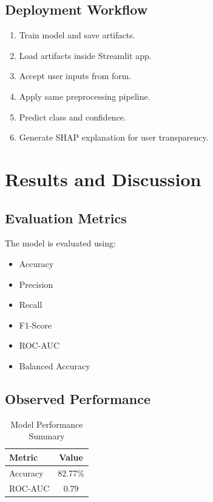 \documentclass[12pt,a4paper]{report}
\begin{document}
\section{Deployment Workflow}
\begin{enumerate}[leftmargin=1.2cm]
    \item Train model and save artifacts.
    \item Load artifacts inside Streamlit app.
    \item Accept user inputs from form.
    \item Apply same preprocessing pipeline.
    \item Predict class and confidence.
    \item Generate SHAP explanation for user transparency.
\end{enumerate}

\chapter{Results and Discussion}

\section{Evaluation Metrics}
The model is evaluated using:
\begin{itemize}[leftmargin=1.2cm]
    \item Accuracy
    \item Precision
    \item Recall
    \item F1-Score
    \item ROC-AUC
    \item Balanced Accuracy
\end{itemize}

\section{Observed Performance}
\begin{table}[H]
\centering
\caption{Model Performance Summary}
\begin{tabular}{lc}
\toprule
\textbf{Metric} & \textbf{Value} \\
\midrule
Accuracy & 82.77\% \\
ROC-AUC & 0.79 \\
\bottomrule
\end{tabular}
\end{table}
\end{document}
